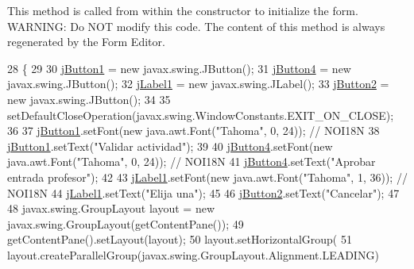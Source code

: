 This method is called from within the constructor to initialize the form. W\+A\+R\+N\+I\+NG\+: Do N\+OT modify this code. The content of this method is always regenerated by the Form Editor. 
\begin{DoxyCode}
28                                   \{
29 
30         \mbox{\hyperlink{classinterfacessoguar_1_1cu1314_a604ecb1ce37ecd98c2325309ac0aea23}{jButton1}} = \textcolor{keyword}{new} javax.swing.JButton();
31         \mbox{\hyperlink{classinterfacessoguar_1_1cu1314_abd74ab1c366767481493ee8d70c7e779}{jButton4}} = \textcolor{keyword}{new} javax.swing.JButton();
32         \mbox{\hyperlink{classinterfacessoguar_1_1cu1314_ababc8bdd3ad91398cdd0c7444b230996}{jLabel1}} = \textcolor{keyword}{new} javax.swing.JLabel();
33         \mbox{\hyperlink{classinterfacessoguar_1_1cu1314_ac2c3897829fe6bdfbec2d57df61549bf}{jButton2}} = \textcolor{keyword}{new} javax.swing.JButton();
34 
35         setDefaultCloseOperation(javax.swing.WindowConstants.EXIT\_ON\_CLOSE);
36 
37         \mbox{\hyperlink{classinterfacessoguar_1_1cu1314_a604ecb1ce37ecd98c2325309ac0aea23}{jButton1}}.setFont(\textcolor{keyword}{new} java.awt.Font(\textcolor{stringliteral}{"Tahoma"}, 0, 24)); \textcolor{comment}{// NOI18N}
38         \mbox{\hyperlink{classinterfacessoguar_1_1cu1314_a604ecb1ce37ecd98c2325309ac0aea23}{jButton1}}.setText(\textcolor{stringliteral}{"Validar actividad"});
39 
40         \mbox{\hyperlink{classinterfacessoguar_1_1cu1314_abd74ab1c366767481493ee8d70c7e779}{jButton4}}.setFont(\textcolor{keyword}{new} java.awt.Font(\textcolor{stringliteral}{"Tahoma"}, 0, 24)); \textcolor{comment}{// NOI18N}
41         \mbox{\hyperlink{classinterfacessoguar_1_1cu1314_abd74ab1c366767481493ee8d70c7e779}{jButton4}}.setText(\textcolor{stringliteral}{"Aprobar entrada profesor"});
42 
43         \mbox{\hyperlink{classinterfacessoguar_1_1cu1314_ababc8bdd3ad91398cdd0c7444b230996}{jLabel1}}.setFont(\textcolor{keyword}{new} java.awt.Font(\textcolor{stringliteral}{"Tahoma"}, 1, 36)); \textcolor{comment}{// NOI18N}
44         \mbox{\hyperlink{classinterfacessoguar_1_1cu1314_ababc8bdd3ad91398cdd0c7444b230996}{jLabel1}}.setText(\textcolor{stringliteral}{"Elija una"});
45 
46         \mbox{\hyperlink{classinterfacessoguar_1_1cu1314_ac2c3897829fe6bdfbec2d57df61549bf}{jButton2}}.setText(\textcolor{stringliteral}{"Cancelar"});
47 
48         javax.swing.GroupLayout layout = \textcolor{keyword}{new} javax.swing.GroupLayout(getContentPane());
49         getContentPane().setLayout(layout);
50         layout.setHorizontalGroup(
51             layout.createParallelGroup(javax.swing.GroupLayout.Alignment.LEADING)

\end{DoxyCode}
